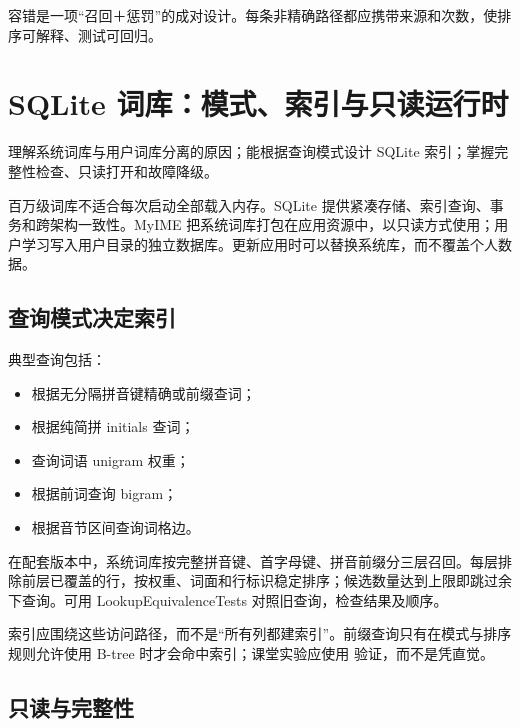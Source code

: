 \begin{summarybox}
容错是一项“召回＋惩罚”的成对设计。每条非精确路径都应携带来源和次数，使排序可解释、测试可回归。
\end{summarybox}


\chapter{SQLite 词库：模式、索引与只读运行时}

\begin{goals}
理解系统词库与用户词库分离的原因；能根据查询模式设计 SQLite 索引；掌握完整性检查、只读打开和故障降级。
\end{goals}

百万级词库不适合每次启动全部载入内存。SQLite 提供紧凑存储、索引查询、事务和跨架构一致性。MyIME 把系统词库打包在应用资源中，以只读方式使用；用户学习写入用户目录的独立数据库。更新应用时可以替换系统库，而不覆盖个人数据。


\section{查询模式决定索引}

典型查询包括：

\begin{itemize}
  \item 根据无分隔拼音键精确或前缀查词；
  \item 根据纯简拼 initials 查词；
  \item 查询词语 unigram 权重；
  \item 根据前词查询 bigram；
  \item 根据音节区间查询词格边。
\end{itemize}

在配套版本中，系统词库按完整拼音键、首字母键、拼音前缀分三层召回。每层排除前层已覆盖的行，按权重、词面和行标识稳定排序；候选数量达到上限即跳过余下查询。可用 LookupEquivalenceTests 对照旧查询，检查结果及顺序。

索引应围绕这些访问路径，而不是“所有列都建索引”。前缀查询只有在模式与排序规则允许使用 B-tree 时才会命中索引；课堂实验应使用  验证，而不是凭直觉。



\section{只读与完整性}

